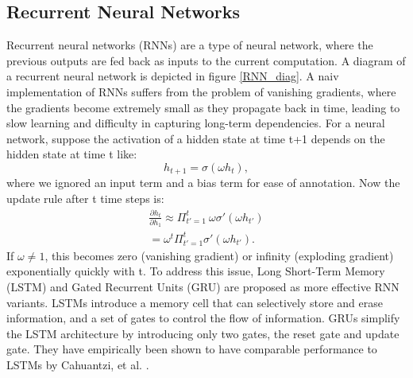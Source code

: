 \subsection{Recurrent Neural Networks}
\label{POMDP_RNN}
Recurrent neural networks (RNNs) are a type of neural network, where the previous outputs are fed back as inputs to the current computation. A diagram of a 
recurrent neural network is depicted in figure \ref{RNN_diag}. 
A naiv implementation of RNNs suffers from the problem of vanishing gradients, where the gradients become extremely small as they propagate back in time, 
leading to slow learning and difficulty in capturing long-term dependencies.
For a neural network, suppose the activation of a hidden state at time t+1 depends on the hidden state at time t like:
\begin{equation}
    h_{t+1} = \sigma(\omega h_t),
\end{equation}
where we ignored an input term and a bias term for ease of annotation. Now the update rule after t time steps is:
\begin{align*}
        \frac{\partial h_t}{\partial h_1} \approx \Pi_{t'=1}^t \ \omega \sigma'(\omega h_{t'}) \\
        = \omega^{t} \Pi_{t'=1}^t \sigma'(\omega h_{t'}).
\end{align*}
If $\omega \neq 1$, this becomes zero (vanishing gradient) or infinity (exploding gradient) exponentially quickly with t.
To address this issue, Long Short-Term Memory (LSTM) and Gated Recurrent Units (GRU) are proposed as more effective RNN variants. 
LSTMs introduce a memory cell that can selectively store and erase information, and a set of gates to control the flow of information. 
GRUs simplify the LSTM architecture by introducing only two gates, the reset gate and update gate. 
They have empirically been shown to have comparable performance to LSTMs by Cahuantzi, et al. \cite{cahuantzi2023comparison}.

